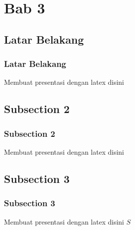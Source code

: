 \section{Bab 3}
\subsection{Latar Belakang}
\begin{frame}
\frametitle{Latar Belakang}
Membuat presentasi dengan latex disini
\end{frame}

\subsection{Subsection 2}
\begin{frame}
\frametitle{Subsection 2}
Membuat presentasi dengan latex disini
\end{frame}

\subsection{Subsection 3}
\begin{frame}
\frametitle{Subsection 3}
Membuat presentasi dengan latex disini $S$
\end{frame}